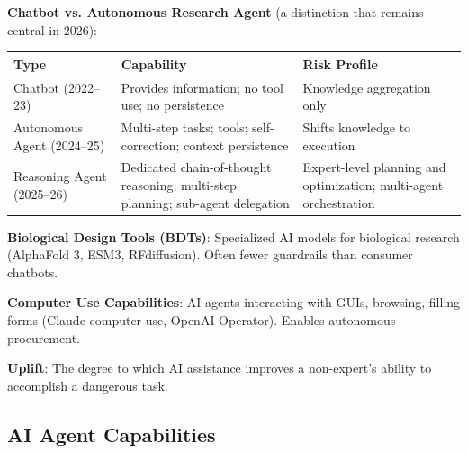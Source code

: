 \documentclass[11pt,letterpaper]{article}
\begin{document}
\begin{defbox}
\textbf{Chatbot vs. Autonomous Research Agent} (a distinction that remains central in 2026):

\vspace{0.5em}
\begin{center}
\small
\begin{tabular}{L{3cm}L{5cm}L{4cm}}
\toprule
\textbf{Type} & \textbf{Capability} & \textbf{Risk Profile} \\
\midrule
Chatbot (2022--23) & Provides information; no tool use; no persistence & Knowledge aggregation only \\
Autonomous Agent (2024--25) & Multi-step tasks; tools; self-correction; context persistence & Shifts knowledge to execution \\
Reasoning Agent (2025--26) & Dedicated chain-of-thought reasoning; multi-step planning; sub-agent delegation & Expert-level planning and optimization; multi-agent orchestration \\
\bottomrule
\end{tabular}
\end{center}

\vspace{0.5em}
\textbf{Biological Design Tools (BDTs)}: Specialized AI models for biological research (AlphaFold 3, ESM3, RFdiffusion). Often fewer guardrails than consumer chatbots.

\vspace{0.5em}
\textbf{Computer Use Capabilities}: AI agents interacting with GUIs, browsing, filling forms (Claude computer use, OpenAI Operator). Enables autonomous procurement.

\vspace{0.5em}
\textbf{Uplift}: The degree to which AI assistance improves a non-expert's ability to accomplish a dangerous task.
\end{defbox}

\subsection{AI Agent Capabilities}
\end{document}
